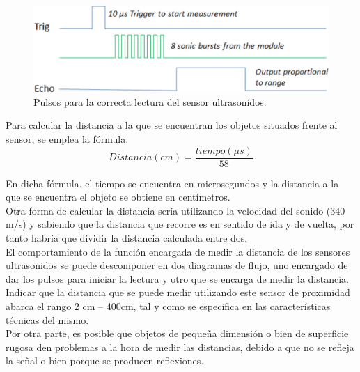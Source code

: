 \begin{figure}[H]
  \begin{center}
    \includegraphics[scale=0.3]{imagenes/grafica_ultrasonido.jpg}
  \end{center}
  \caption{Pulsos para la correcta lectura del sensor ultrasonidos.}
  \label{figura:rpi-modulo-bateria}
\end{figure}

Para calcular la distancia a la que se encuentran los objetos situados frente al sensor, se emplea la
fórmula:\\

\begin{equation}
Distancia (cm) = \dfrac{tiempo (\mu s)}{58}
\end{equation}

En dicha fórmula, el tiempo se encuentra en microsegundos y la distancia a la que se encuentra
el objeto se obtiene en centímetros.\\

Otra forma de calcular la distancia sería utilizando la velocidad del sonido (340 m/s) y sabiendo
que la distancia que recorre es en sentido de ida y de vuelta, por tanto habría que dividir la
distancia calculada entre dos.\\

El comportamiento de la función encargada de medir la distancia de los sensores ultrasonidos se
puede descomponer en dos diagramas de flujo, uno encargado de dar los pulsos para iniciar la
lectura y otro que se encarga de medir la distancia.\\

Indicar que la distancia que se puede medir utilizando este sensor de proximidad
abarca el rango 2 cm – 400cm, tal y como se especifica en las características técnicas del mismo.\\

Por otra parte, es posible que objetos de pequeña dimensión o bien de superficie rugosa den problemas
a la hora de medir las distancias, debido a que no se refleja la señal o bien porque se producen
reflexiones.\\


